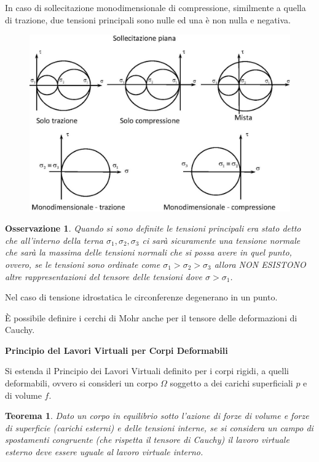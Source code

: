 \documentclass{article}
\newtheorem*{thm}{Teorema}
\newtheorem*{oss}{Osservazione}
\begin{document}
\begin{adjustwidth}{2in}{}
	In caso di sollecitazione monodimensionale di compressione, similmente a quella di trazione, due tensioni principali sono nulle ed una è non nulla e negativa.
\begin{figure}[H]
	\centering
	\includegraphics[width=0.8\linewidth]{immagini/1.PARTE7_Pagina_43}
\end{figure}

	\begin{oss}
		Quando si sono definite le tensioni principali era stato detto che all'interno della terna $\sigma_1,\sigma_2,\sigma_3$ ci sarà sicuramente una tensione normale che sarà la massima delle tensioni normali che si possa avere in quel punto, ovvero, se le tensioni sono ordinate come \(\sigma_1>\sigma_2>\sigma_3\) allora NON ESISTONO altre rappresentazioni del tensore delle tensioni dove $\sigma>\sigma_1$.
	\end{oss}

	Nel caso di tensione idrostatica le circonferenze degenerano in un punto. \newline

	È possibile definire i cerchi di Mohr anche per il tensore delle deformazioni di Cauchy.
	 
\newpage

{\Large \textbf{Principio del Lavori Virtuali per Corpi Deformabili}} \newline 

	Si estenda il Principio dei Lavori Virtuali definito per i corpi rigidi, a quelli deformabili, ovvero si consideri un corpo $\Omega$ soggetto a dei carichi superficiali $ p $ e di volume $ f $. \newline
	
	\begin{thm}
		Dato un corpo in equilibrio sotto l’azione di forze di volume e forze di superficie (carichi
		esterni) e delle tensioni interne, se si considera un campo di spostamenti congruente
		(che rispetta il tensore di Cauchy) il lavoro virtuale esterno deve essere uguale al lavoro
		virtuale interno.
	\end{thm}


\end{adjustwidth}
\end{document}
